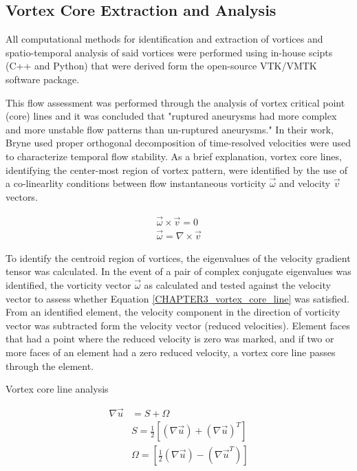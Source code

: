 \subsection{Vortex Core Extraction and Analysis}\label{CHAPTER3_SECTION1_SUBSECTION4}
All computational methods for identification and extraction of vortices and spatio-temporal analysis of said vortices were performed using in-house scipts (C++ and Python) that were derived form the open-source VTK/VMTK software package.


 


This flow assessment was performed through the analysis of vortex critical point (core) lines and it was concluded that "ruptured aneurysms had more complex and more unstable flow patterns than un-ruptured aneurysms." In their work, Bryne used proper orthogonal decomposition \cite{} of time-resolved velocities were used to characterize temporal flow stability. As a brief explanation, vortex core lines, identifying the center-most region of vortex pattern, were identified by the use of a co-linearlity conditions between flow instantaneous vorticity $\vec{\omega}$ and velocity $\vec{v}$ vectors.

\begin{equation}
\begin{aligned}
\vec{\omega} \times \vec{v} = 0 \\
\vec{\omega} = \nabla \times \vec{v}
\end{aligned}
\label{CHAPTER3_vortex_core_line}
\end{equation}

To identify the centroid region of vortices, the eigenvalues of the velocity gradient tensor was calculated. In the event of a pair of complex conjugate eigenvalues was identified, the vorticity vector $\vec{\omega}$ as calculated and tested against the velocity vector to assess whether Equation \ref{CHAPTER3_vortex_core_line} was satisfied. From an identified element, the velocity component in the direction of vorticity vector was subtracted form the velocity vector (reduced velocities). Element faces that had a point where the reduced velocity is zero was marked, and if two or more faces of an element had a zero reduced velocity, a vortex core line passes through the element. 

Vortex core line analysis 



\begin{equation}
\begin{aligned}
\nabla \vec{u} & = S + \Omega \\
  			   & S = \frac{1}{2}\left[(\nabla \vec{u}) + (\nabla \vec{u})^T\right] \\
  			   & \Omega = \left[\frac{1}{2}(\nabla \vec{u}) - (\nabla \vec{u}^T)\right]
\end{aligned}
 \label{CHAPTER3_velocity_gradient_tensor}
\end{equation}

